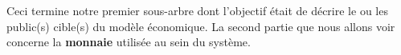 \begin{description}
%
%
%
%

Ceci termine notre premier sous-arbre dont l'objectif était de décrire le ou les public(s) cible(s) du modèle économique.  La second partie que nous allons voir concerne la \textbf{monnaie} utilisée au sein du système.

\begin{center}
\end{center}


\end{description}
